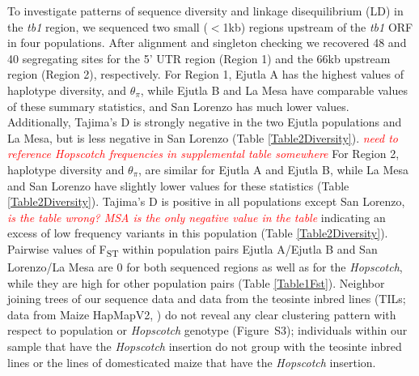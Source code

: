 \documentclass[11pt]{article}
\newcommand{\mbh}[1]{\textcolor{red}{ \emph{\scriptsize  #1}} }
\begin{document}
\begin{linenumbers}
\begin{flushleft}
To investigate patterns of sequence diversity and linkage disequilibrium (LD) in the \emph{tb1} region, we sequenced two small ($<$1kb) regions upstream of the \emph{tb1} ORF in four populations. After alignment and singleton checking we recovered 48 and 40 segregating sites for the 5' UTR region (Region 1) and the 66kb upstream region (Region 2), respectively. For Region 1, Ejutla A has the highest values of haplotype diversity, and $\theta_\pi$, while Ejutla B and La Mesa have comparable values of these summary statistics, and San Lorenzo has much lower values. Additionally, Tajima's D is strongly negative in the two Ejutla populations and La Mesa, but is less negative in San Lorenzo (Table \ref{Table2Diversity}). \mbh{need to reference \emph{Hopscotch} frequencies in supplemental table somewhere} For Region 2, haplotype diversity and $\theta_\pi$, are similar for Ejutla A and Ejutla B, while La Mesa and San Lorenzo have slightly lower values for these statistics (Table \ref{Table2Diversity}). Tajima's D is positive in all populations except San Lorenzo, \mbh{is the table wrong? MSA is the only negative value in the table} indicating an excess of low frequency variants in this population (Table \ref{Table2Diversity}). Pairwise values of F\textsubscript{ST} within population pairs Ejutla A/Ejutla B and San Lorenzo/La Mesa are 0 for both sequenced regions as well as for the \emph{Hopscotch}, while they are high for other population pairs (Table \ref{Table1Fst}). Neighbor joining trees of our sequence data and data from the teosinte inbred lines (TILs; data from Maize HapMapV2, \citealt{Chia2012}) do not reveal any clear clustering pattern with respect to population or \emph{Hopscotch} genotype (Figure~S3); individuals within our sample that have the \emph{Hopscotch} insertion do not group with the teosinte inbred lines or the lines of domesticated maize that have the \emph{Hopscotch} insertion. 


\end{flushleft}
\end{linenumbers}
\end{document}
